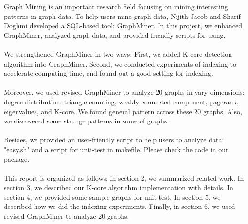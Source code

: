 Graph Mining is an important research field focusing on mining interesting patterns in graph data. To help users mine graph data, Nijith Jacob and Sharif Doghmi developed a SQL-based tool: GraphMiner. In this project, we enhanced GraphMiner, analyzed graph data, and provided friendly scripts for using.  
\\
\\
We strengthened GraphMiner in two ways: First, we added K-core detection algorithm into GraphMiner. Second, we conducted experiments of indexing to accelerate computing time, and found out a good setting for indexing. 
\\
\\
Moreover, we used revised GraphMiner to analyze 20 graphs in vary dimensions: degree distribution, triangle counting, weakly connected component, pagerank, eigenvalues, and K-core. We found general pattern across these 20 graphs. Also, we discovered some strange patterns in some of graphs.
\\
\\
Besides, we provided an user-friendly script to help users to analyze data: "easy.sh" and a script for unti-test in makefile. Please check the code in our package.
\\
\\
This report is organized as follows: in section 2, we summarized related work. In section 3, we described our K-core algorithm implementation with details. In section 4, we provided some sample graphs for unit test. In section 5, we described how we did the indexing experiments. Finally, in section 6, we used revised GraphMiner to analyze 20 graphs. 